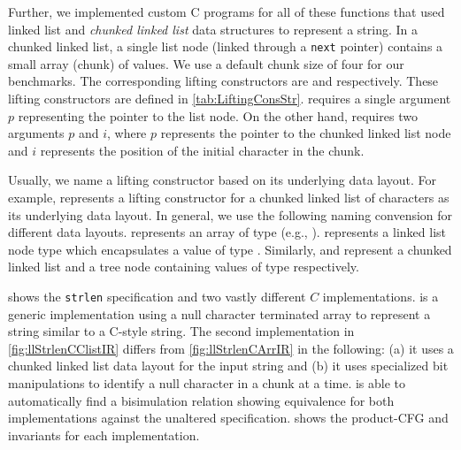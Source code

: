 Further, we implemented
custom C programs for all of these functions that used
linked list
and {\em chunked linked list} data structures
to represent a string.
In a chunked linked list, a single list node (linked
through a {\tt next} pointer)
contains a small array (chunk) of values.
We use a default chunk size of four for our
benchmarks.
The corresponding lifting constructors are 
and  respectively.
These lifting constructors are defined in \cref{tab:LiftingConsStr}.
 requires a single
argument $p$ representing the pointer to the list node.
On the other hand,  requires two arguments $p$
and $i$, where $p$ represents the pointer to the chunked linked list node
and $i$ represents the position of the initial character in the chunk.

Usually, we name a lifting constructor based on its underlying data layout.
For example,  represents a lifting constructor
for a chunked linked list of characters as its underlying data layout.
In general, we use the following naming convension for different data layouts.
 represents an array of type  (e.g., ).
 represents a  linked list node type which encapsulates a value of type .
Similarly,  and  represent a chunked linked list and a tree node
containing values of type  respectively.



 shows the {\tt strlen} specification and two vastly
different $C$ implementations.  is a generic implementation
using a null character terminated array to represent a string similar to a C-style string.
The second implementation in \cref{fig:llStrlenCClistIR} differs from \cref{fig:llStrlenCArrIR}
in the following: (a) it uses a chunked linked list data layout for the input string
and (b) it uses specialized bit manipulations to identify a null character in a chunk at a time.
\toolName{} is able to automatically find a bisimulation relation showing equivalence
for both implementations against the unaltered specification.
 shows the product-CFG and invariants for each implementation.


\vspace{-10px}
